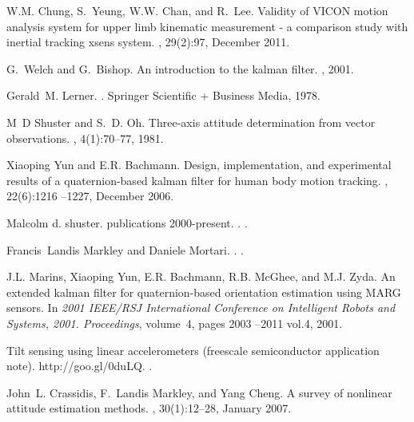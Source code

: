 \documentclass{IOS-Book-Article}
\begin{document}
\begin{thebibliography}{99}
{W.M.} Chung, S.~Yeung, {W.W.} Chan, and R.~Lee.
\newblock Validity of {VICON} motion analysis system for upper limb kinematic
  measurement - a comparison study with inertial tracking xsens system.
, 29(2):97, December 2011.

G.~Welch and G.~Bishop.
\newblock An introduction to the kalman filter.
, 2001.

Gerald~M. Lerner.
.
\newblock Springer Scientific + Business Media, 1978.

M~D Shuster and S.~D. Oh.
\newblock Three-axis attitude determination from vector observations.
, 4(1):70--77, 1981.

Xiaoping Yun and {E.R.} Bachmann.
\newblock Design, implementation, and experimental results of a
  quaternion-based kalman filter for human body motion tracking.
, 22(6):1216 --1227, December
  2006.

Malcolm d. shuster. publications 2000-present.
.
.

Francis~Landis Markley and Daniele Mortari.
.
.

{J.L.} Marins, Xiaoping Yun, {E.R.} Bachmann, {R.B.} {McGhee}, and {M.J.} Zyda.
\newblock An extended kalman filter for quaternion-based orientation estimation
  using {MARG} sensors.
\newblock In {\em 2001 {IEEE/RSJ} International Conference on Intelligent
  Robots and Systems, 2001. Proceedings}, volume~4, pages 2003 --2011 vol.4,
  2001.

Tilt sensing using linear accelerometers (freescale semiconductor application
  note).
\newblock http://goo.gl/0duLQ.
.

John~L. Crassidis, F.~Landis Markley, and Yang Cheng.
\newblock A survey of nonlinear attitude estimation methods.
, 30(1):12--28,
  January 2007.


\end{thebibliography}
\end{document}
